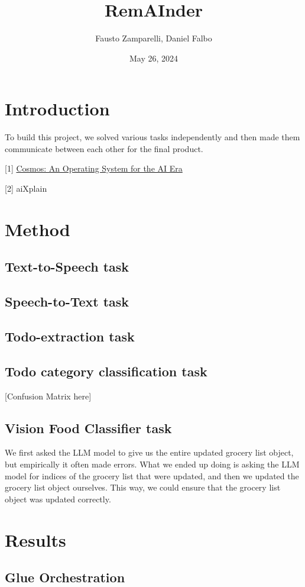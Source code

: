 \documentclass{article}
\title{RemAInder}
\author{Fausto Zamparelli, Daniel Falbo}
\date{May 26, 2024}
\begin{document}
\maketitle


\section*{Introduction}
To build this project, we solved various tasks independently and then made them communicate between each other for the final product.

[1] \href{https://humane.com/media/cosmos-an-operating-system-for-the-ai-era}{Cosmos: An Operating System for the AI Era}

[2] aiXplain


\section*{Method}


\subsection*{Text-to-Speech task}

\subsection*{Speech-to-Text task}

\subsection*{Todo-extraction task}

\subsection*{Todo category classification task}

[Confusion Matrix here]

\subsection*{Vision Food Classifier task}

We first asked the LLM model to give us the entire updated grocery list object, but empirically it often made errors. What we ended up doing is asking the LLM model for indices of the grocery list that were updated, and then we updated the grocery list object ourselves. This way, we could ensure that the grocery list object was updated correctly.


\section*{Results}

\subsection*{Glue Orchestration}
\end{document}
